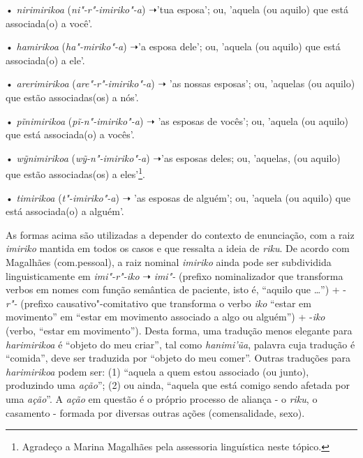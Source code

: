 • \emph{nirimirikoa} (\emph{ni"-r"-imiriko"-a}) ➝'tua esposa'; ou, 'aquela
(ou aquilo) que está associada(o) a você'.

• \emph{hamirikoa} (\emph{ha"-miriko"-a}) ➝'a esposa dele'; ou, 'aquela
(ou aquilo) que está associada(o) a ele'.

• \emph{arerimirikoa} (\emph{are"-r"-imiriko"-a}) ➝ 'as nossas esposas';
ou, 'aquelas (ou aquilo) que estão associadas(os) a nós'.

• \emph{pĩnimirikoa} (\emph{pĩ-n"-imiriko"-a}) ➝ 'as esposas de vocês';
ou, 'aquela (ou aquilo) que está associada(o) a vocês'.

• \emph{wỹnimirikoa} (\emph{wỹ-n"-imiriko"-a}) ➝'as esposas deles; ou,
'aquelas, (ou aquilo) que estão associadas(os) a eles'\footnote{Agradeço
  a Marina Magalhães pela assessoria linguística neste tópico.}.

• \emph{timirikoa} (\emph{t"-imiriko"-a}) ➝ 'as esposas de alguém'; ou,
'aquela (ou aquilo) que está associada(o) a alguém'.

As formas acima são utilizadas a depender do contexto de enunciação, com
a raiz \emph{imiriko} mantida em todos os casos e que ressalta a ideia
de \emph{riku}. De acordo com Magalhães (com.pessoal), a raiz nominal
\emph{imiriko} ainda pode ser subdividida linguisticamente em
\emph{{imi"-r"-iko}} ➝ \emph{imi"-} (prefixo nominalizador que transforma
verbos em nomes com função semântica de paciente, isto é, ``aquilo que
\ldots{}'') + -\emph{r"-} (prefixo causativo"-comitativo que transforma o verbo
\emph{iko} ``estar em movimento'' em ``estar em movimento associado a algo
ou alguém'') + -\emph{iko} (verbo, ``estar em movimento''). Desta forma,
uma tradução menos elegante para \emph{harimirikoa} é ``objeto do meu
criar'', tal como \emph{hanimi'ũa}, palavra cuja tradução é ``comida'',
deve ser traduzida por ``objeto do meu comer''. Outras traduções para
\emph{harimirikoa} podem ser: (1) ``aquela a quem estou associado (ou
junto), produzindo uma \emph{ação}''; (2) ou ainda, ``aquela que está
comigo sendo afetada por uma \emph{ação}''. A \emph{ação} em questão é o
próprio processo de aliança - o \emph{riku}, o casamento - formada por
diversas outras ações (comensalidade, sexo).

